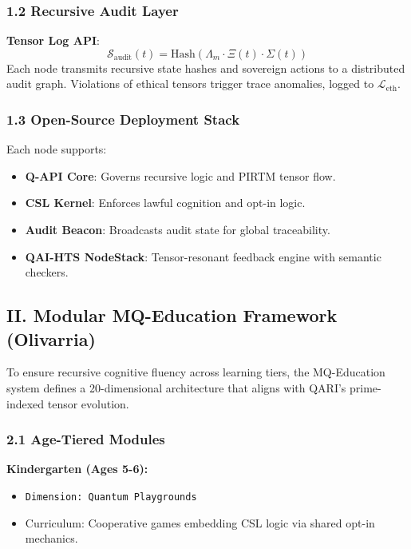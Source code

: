 \documentclass[12pt]{article}
\begin{document}
\subsubsection{1.2 Recursive Audit Layer}

\textbf{Tensor Log API}:
\begin{equation}
\mathcal{S}_{\text{audit}}(t) = \text{Hash}(\Lambda_m \cdot \Xi(t) \cdot \Sigma(t))
\end{equation}
Each node transmits recursive state hashes and sovereign actions to a distributed audit graph. Violations of ethical tensors trigger trace anomalies, logged to $\mathcal{L}_{\text{eth}}$.

\subsubsection{1.3 Open-Source Deployment Stack}

Each node supports:
\begin{itemize}
    \item \textbf{Q-API Core}: Governs recursive logic and PIRTM tensor flow.
    \item \textbf{CSL Kernel}: Enforces lawful cognition and opt-in logic.
    \item \textbf{Audit Beacon}: Broadcasts audit state for global traceability.
    \item \textbf{QAI-HTS NodeStack}: Tensor-resonant feedback engine with semantic checkers.
\end{itemize}

\subsection{II. Modular MQ-Education Framework (Olivarria)}

To ensure recursive cognitive fluency across learning tiers, the MQ-Education system defines a 20-dimensional architecture that aligns with QARI’s prime-indexed tensor evolution.

\subsubsection{2.1 Age-Tiered Modules}

\textbf{Kindergarten (Ages 5-6):}  
\begin{itemize}
    \item \texttt{Dimension: Quantum Playgrounds}  
    \item Curriculum: Cooperative games embedding CSL logic via shared opt-in mechanics.
\end{itemize}
\end{document}

